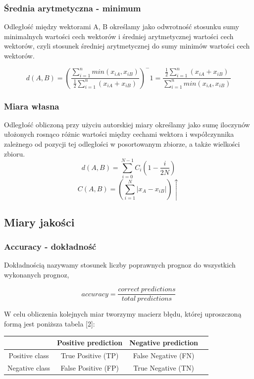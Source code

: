 \documentclass{classrep}
\begin{document}
\subsubsection{Średnia arytmetyczna - minimum}
Odległość między wektorami A, B określamy jako odwrotność stosunku sumy minimalnych wartości cech wektorów i średniej arytmetycznej wartości cech wektorów, czyli stosunek średniej arytmetycznej do sumy minimów wartości cech wektorów.

\begin{equation}
d(A, B) =  (\frac{\sum_{i=1}^n{min(x_{iA}, x_{iB})}}{\frac{1}{2}\sum_{i=1}^n({x_{iA} + x_{iB}})})^-1 = \frac{\frac{1}{2}\sum_{i=1}^n({x_{iA} + x_{iB}})}{\sum_{i=1}^n{min(x_{iA}, x_{iB})}}
\end{equation}
\subsubsection{Miara własna}
Odległość obliczoną przy użyciu autorskiej miary określamy jako sumę iloczynów ułożonych rosnąco różnic wartości między cechami wektora i współczynnika zależnego od pozycji tej odległości w posortowanym zbiorze, a także wielkości zbioru.
\begin{equation}
d(A, B) =  \sum_{i=0}^{N-1}C_i(1 - \frac{i}{2N})
\end{equation}
\begin{equation}
C(A,B) =  (\sum_{i=1}^N|x_{A} - x_{iB}|)\uparrow
\end{equation}

\subsection{Miary jakości}
\subsubsection{Accuracy - dokładność}
Dokładnością nazywamy stosunek liczby poprawnych prognoz do wszystkich wykonanych prognoz,

\begin{equation}
accuracy = \frac{correct\ predictions}{total\ predictions}
\end{equation}

W celu obliczenia kolejnych miar tworzymy macierz błędu, której uproszczoną formą jest poniższa tabela [2]:

\begin{center}
	\begin{tabular}{ |c|c|c|c| } 
	\hline
	 & Positive prediction & Negative prediction \\
	\hline
	Positive class & True Positive (TP) & False Negative (FN) \\ 
	\hline
	Negative class & False Positive (FP) & True Negative (TN) \\ 
	\hline
	\end{tabular}
\end{center}
\end{document}

